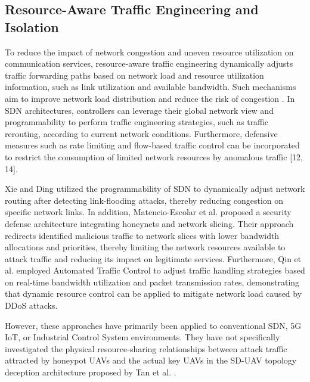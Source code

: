 \begin{ZhChapter}

\section{Resource-Aware Traffic Engineering and Isolation}

To reduce the impact of network congestion and uneven resource utilization on communication services, resource-aware traffic engineering dynamically adjusts traffic forwarding paths based on network load and resource utilization information, such as link utilization and available bandwidth. Such mechanisms aim to improve network load distribution and reduce the risk of congestion \cite{rostami:2024}. In SDN architectures, controllers can leverage their global network view and programmability to perform traffic engineering strategies, such as traffic rerouting, according to current network conditions. Furthermore, defensive measures such as rate limiting and flow-based traffic control can be incorporated to restrict the consumption of limited network resources by anomalous traffic [12, 14].

Xie and Ding \cite{xie:2019} utilized the programmability of SDN to dynamically adjust network routing after detecting link-flooding attacks, thereby reducing congestion on specific network links. In addition, Matencio-Escolar et al. \cite{matencio:2024} proposed a security defense architecture integrating honeynets and network slicing. Their approach redirects identified malicious traffic to network slices with lower bandwidth allocations and priorities, thereby limiting the network resources available to attack traffic and reducing its impact on legitimate services. Furthermore, Qin et al. \cite{qin:2025} employed Automated Traffic Control to adjust traffic handling strategies based on real-time bandwidth utilization and packet transmission rates, demonstrating that dynamic resource control can be applied to mitigate network load caused by DDoS attacks.

However, these approaches have primarily been applied to conventional SDN, 5G IoT, or Industrial Control System environments. They have not specifically investigated the physical resource-sharing relationships between attack traffic attracted by honeypot UAVs and the actual key UAVs in the SD-UAV topology deception architecture proposed by Tan et al. \cite{tan:2022}.


\end{ZhChapter}
